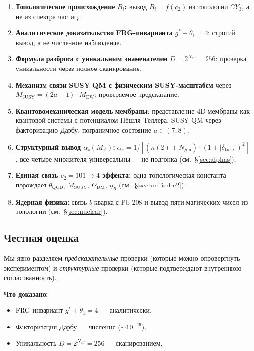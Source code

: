 \documentclass[11pt,a4paper]{article}
\newcommand{\CY}{\ensuremath{CY_3}}
\newcommand{\gstar}{\ensuremath{g^*}}
\newcommand{\Neff}{\ensuremath{N_{\text{eff}}}}
\newcommand{\MEW}{\ensuremath{M_{\text{EW}}}}
\newcommand{\MSUSY}{\ensuremath{M_{\text{SUSY}}}}
\newcommand{\cTwo}{\ensuremath{c_2}}
\theoremstyle{definition}
\begin{document}
\begin{enumerate}
    \item \textbf{Топологическое происхождение $B_i$:}
          вывод $B_i = f(\cTwo)$ из топологии $\CY$,
          а не из спектра частиц.
    \item \textbf{Аналитическое доказательство FRG-инварианта}
          $\gstar + \theta_1 = 4$: строгий вывод,
          а не численное наблюдение.
    \item \textbf{Формула разброса с уникальным знаменателем}
          $D = 2^{\Neff} = 256$: проверка уникальности через
          полное сканирование.
    \item \textbf{Механизм связи SUSY QM с физическим SUSY-масштабом}
          через $\MSUSY = (2a-1) \cdot \MEW$: проверяемое предсказание.
    \item \textbf{Квантовомеханическая модель мембраны}:
          представление 4D-мембраны как квантовой системы
          с потенциалом Пёшля--Теллера, SUSY QM через
          факторизацию Дарбу, пограничное состояние
          $a \in (7, 8)$.
    \item \textbf{Структурный вывод $\alpha_s(M_Z)$:}
          $\alpha_s = 1/[(n(2)+N_{\text{gen}})
          \cdot (1+|\delta_{\text{time}}|)^2]$, все четыре
          множителя универсальны — не подгонка (см.~\S\ref{sec:alphas}).
    \item \textbf{Единая связь $c_2 = 101 \to 4$ эффекта:}
          одна топологическая константа порождает $\theta_{\text{QCD}}$,
          $M_{\text{SUSY}}$, $\Omega_{\text{DM}}$, $\eta_B$
          (см.~\S\ref{sec:unified-c2}).
    \item \textbf{Ядерная физика:} связь $b$-кварка с Pb-208
          и вывод пяти магических чисел из топологии
          (см.~\S\ref{sec:nuclear}).
\end{enumerate}

\subsection{Честная оценка}

Мы явно разделяем \emph{предсказательные} проверки (которые можно
опровергнуть экспериментом) и \emph{структурные} проверки
(которые подтверждают внутреннюю согласованность).

\medskip\noindent
\textbf{Что доказано:}
\begin{itemize}
    \item FRG-инвариант $\gstar + \theta_1 = 4$ --- аналитически.
    \item Факторизация Дарбу --- численно ($\sim 10^{-16}$).
    \item Уникальность $D = 2^{\Neff} = 256$ --- сканированием.
\end{itemize}
\end{document}
